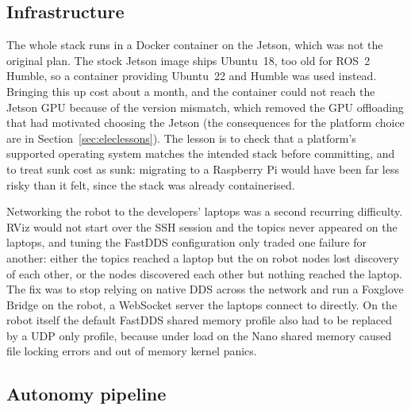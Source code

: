\documentclass[11pt]{article}
\begin{document}
\subsection{Infrastructure}\label{sec:swlessons}
The whole stack runs in a Docker container on the Jetson, which was not the original plan. The stock Jetson image ships Ubuntu~18, too old for ROS~2 Humble, so a container providing Ubuntu~22 and Humble was used instead. Bringing this up cost about a month, and the container could not reach the Jetson GPU because of the version mismatch, which removed the GPU offloading that had motivated choosing the Jetson (the consequences for the platform choice are in Section~\ref{sec:eleclessons}). The lesson is to check that a platform's supported operating system matches the intended stack before committing, and to treat sunk cost as sunk: migrating to a Raspberry Pi would have been far less risky than it felt, since the stack was already containerised.

Networking the robot to the developers' laptops was a second recurring difficulty. RViz would not start over the SSH session and the topics never appeared on the laptops, and tuning the FastDDS configuration only traded one failure for another: either the topics reached a laptop but the on robot nodes lost discovery of each other, or the nodes discovered each other but nothing reached the laptop. The fix was to stop relying on native DDS across the network and run a Foxglove Bridge on the robot, a WebSocket server the laptops connect to directly. On the robot itself the default FastDDS shared memory profile also had to be replaced by a UDP only profile, because under load on the Nano shared memory caused file locking errors and out of memory kernel panics.

\subsection{Autonomy pipeline}
\end{document}
